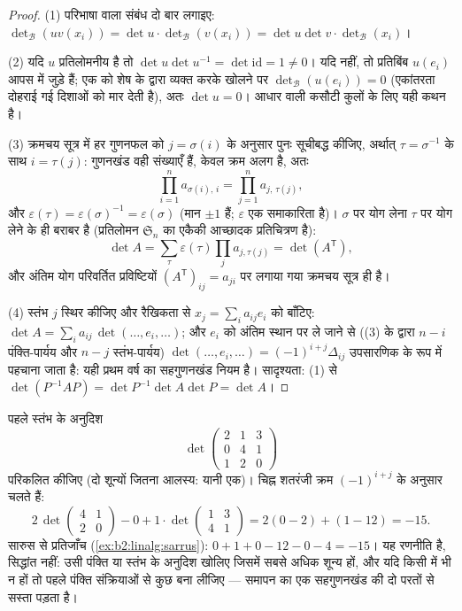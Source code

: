 \begin{proof}
(1) परिभाषा वाला संबंध दो बार लगाइए: $\det_{\mathcal B}(uv(x_i)) = \det u \cdot \det_{\mathcal
B}(v(x_i)) = \det u \det v \cdot \det_{\mathcal B}(x_i)$।

(2) यदि $u$ प्रतिलोमनीय है तो $\det u \det u^{-1} = \det \mathrm{id} =
1 \neq 0$। यदि नहीं, तो प्रतिबिंब $u(e_i)$ आपस में
जुड़े हैं; एक को शेष के द्वारा व्यक्त करके खोलने पर $\det_{\mathcal B}(u(e_i)) = 0$ (एकांतरता
दोहराई गई दिशाओं को मार देती है), अतः $\det u = 0$। आधार वाली कसौटी कुलों के
लिए यही कथन है।

(3) क्रमचय सूत्र में हर गुणनफल को $j =
\sigma(i)$ के अनुसार पुनः सूचीबद्ध कीजिए,
अर्थात् $\tau = \sigma^{-1}$ के साथ $i = \tau(j)$: गुणनखंड वही संख्याएँ हैं, केवल क्रम अलग है,
अतः
\[
\prod_{i=1}^{n} a_{\sigma(i),\,i} = \prod_{j=1}^{n}
a_{j,\,\tau(j)} ,
\]
और $\varepsilon(\tau) = \varepsilon(\sigma)^{-1} =
\varepsilon(\sigma)$ (मान $\pm1$ हैं; $\varepsilon$ एक समाकारिता है)। $\sigma$ पर योग लेना $\tau$ पर योग
लेने के ही बराबर है (प्रतिलोमन $\mathfrak{S}_n$ का एकैकी आच्छादक प्रतिचित्रण है):
\[
\det A = \sum_{\tau}\varepsilon(\tau)\prod_j a_{j,\tau(j)}
= \det(A^{\mathsf T}),
\]
और अंतिम योग परिवर्तित प्रविष्टियों $(A^{\mathsf T})_{ij} = a_{ji}$ पर लगाया गया क्रमचय सूत्र ही
है।

(4) स्तंभ $j$ स्थिर कीजिए और रैखिकता से $x_j = \sum_i a_{ij} e_i$ को बाँटिए: $\det A = \sum_i a_{ij}\, \det(\dots, e_i, \dots)$; और $e_i$ को
अंतिम स्थान पर ले जाने से ((3) के द्वारा $n - i$ पंक्ति-पार्यय और $n - j$
स्तंभ-पार्यय) $\det(\dots, e_i, \dots) =
(-1)^{i+j}\Delta_{ij}$ उपसारणिक के रूप में पहचाना जाता है: यही प्रथम वर्ष
का सहगुणनखंड नियम है। सादृश्यता: (1) से $\det(P^{-1}AP) = \det P^{-1}\det A \det P =
\det A$।
\end{proof}

\begin{example}\label{ex:b2:linalg:cofactorwork}
पहले स्तंभ के अनुदिश
\[
\det\begin{pmatrix}
2 & 1 & 3\\
0 & 4 & 1\\
1 & 2 & 0
\end{pmatrix}
\]
परिकलित कीजिए (दो शून्यों जितना आलस्य: यानी एक)। चिह्न शतरंजी क्रम
$(-1)^{i+j}$ के अनुसार चलते हैं:
\[
2\,\det\begin{pmatrix}4 & 1\\ 2 & 0\end{pmatrix}
- 0
+ 1\cdot\det\begin{pmatrix}1 & 3\\ 4 & 1\end{pmatrix}
= 2(0 - 2) + (1 - 12) = -15 .
\]
सारुस से प्रतिजाँच (\cref{ex:b2:linalg:sarrus}): $0 + 1 + 0
- 12 - 0 - 4 = -15$। यह रणनीति है, सिद्धांत नहीं: उसी
पंक्ति या स्तंभ के अनुदिश खोलिए जिसमें सबसे अधिक शून्य हों, और यदि
किसी में भी न हों तो पहले पंक्ति संक्रियाओं से कुछ बना लीजिए --- समापन
का एक  सहगुणनखंड की दो परतों से सस्ता पड़ता है।
\end{example}

